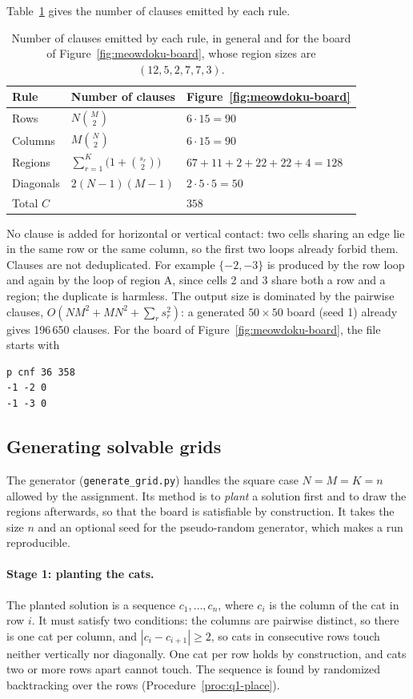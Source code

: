 Table~\ref{tab:q1-counts} gives the number of clauses emitted by each rule.
\begin{table}[H]
\centering
\begin{tabular}{@{}lll@{}}
\toprule
Rule & Number of clauses & Figure~\ref{fig:meowdoku-board}\\
\midrule
Rows & $N\binom{M}{2}$ & $6\cdot15=90$\\
Columns & $M\binom{N}{2}$ & $6\cdot15=90$\\
Regions & $\sum_{r=1}^{K}\bigl(1+\binom{s_r}{2}\bigr)$ & $67+11+2+22+22+4=128$\\
Diagonals & $2(N-1)(M-1)$ & $2\cdot5\cdot5=50$\\
\midrule
Total $C$ & & $358$\\
\bottomrule
\end{tabular}
\caption{Number of clauses emitted by each rule, in general and for the board of Figure~\ref{fig:meowdoku-board}, whose region sizes are $(12,5,2,7,7,3)$.}
\label{tab:q1-counts}
\end{table}
No clause is added for horizontal or vertical contact: two cells sharing an edge lie in the same row or the same column, so the first two loops already forbid them. Clauses are not deduplicated. For example $\{-2,-3\}$ is produced by the row loop and again by the loop of region A, since cells 2 and 3 share both a row and a region; the duplicate is harmless. The output size is dominated by the pairwise clauses, $O(NM^2+MN^2+\sum_r s_r^2)$: a generated $50\times50$ board (seed 1) already gives 196\,650 clauses. For the board of Figure~\ref{fig:meowdoku-board}, the file starts with
\begin{verbatim}
p cnf 36 358
-1 -2 0
-1 -3 0
\end{verbatim}

\subsection{Generating solvable grids}

The generator (\texttt{generate\_grid.py}) handles the square case $N=M=K=n$ allowed by the assignment. Its method is to \emph{plant} a solution first and to draw the regions afterwards, so that the board is satisfiable by construction. It takes the size $n$ and an optional seed for the pseudo-random generator, which makes a run reproducible.

\paragraph{Stage 1: planting the cats.}
The planted solution is a sequence $c_1,\ldots,c_n$, where $c_i$ is the column of the cat in row $i$. It must satisfy two conditions: the columns are pairwise distinct, so there is one cat per column, and $|c_i-c_{i+1}|\ge2$, so cats in consecutive rows touch neither vertically nor diagonally. One cat per row holds by construction, and cats two or more rows apart cannot touch. The sequence is found by randomized backtracking over the rows (Procedure~\ref{proc:q1-place}).

